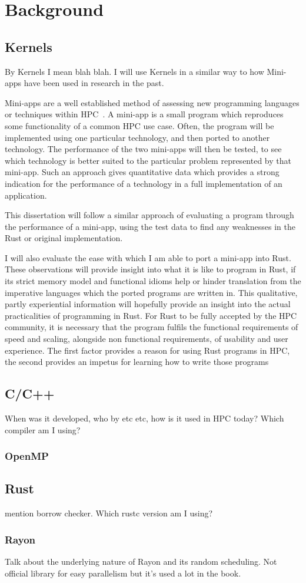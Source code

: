 \chapter{Background}
\section{Kernels}
By Kernels I mean blah blah. I will use Kernels in a similar way to how Mini-apps have been used in research in the past.

Mini-apps are a well established method of assessing new programming languages or techniques within HPC~\cite{Mallinson:2014, Slaughter:2015, martineau2017arch}. A mini-app is a small program which reproduces some functionality of a common HPC use case. Often, the program will be implemented using one particular technology, and then ported to another technology. The performance of the two mini-apps will then be tested, to see which technology is better suited to the particular problem represented by that mini-app. Such an approach gives quantitative data which provides a strong indication for the performance of a technology in a full implementation of an application.

This dissertation will follow a similar approach of evaluating a program through the performance of a mini-app, using the test data to find any weaknesses in the Rust or original implementation.

I will also evaluate the ease with which I am able to port a mini-app into Rust. These observations will provide insight into what it is like to program in Rust, if its strict memory model and functional idioms help or hinder translation from the imperative languages which the ported programs are written in. This qualitative, partly experiential information will hopefully provide an insight into the actual practicalities of programming in Rust. For Rust to be fully accepted by the HPC community, it is necessary that the program fulfils the functional requirements of speed and scaling, alongside non functional requirements, of usability and user experience. The first factor provides a reason for using Rust programs in HPC, the second provides an impetus for learning how to write those programs

\section{C/C++}
When was it developed, who by etc etc, how is it used in HPC today? Which compiler am I using?
\subsection{OpenMP}

\section{Rust}
mention borrow checker. Which rustc version am I using?
\subsection{Rayon}
Talk about the underlying nature of Rayon and its random scheduling. Not official library for easy parallelism but it's used a lot in the book.
